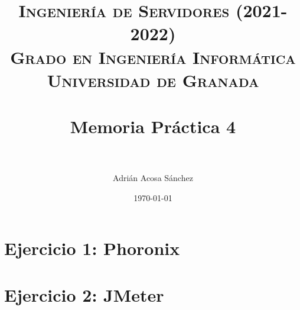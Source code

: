 


\title{	
\normalfont \normalsize 
\textsc{\textbf{Ingeniería de Servidores (2021-2022)} \\ Grado en Ingeniería Informática \\ Universidad de Granada} \\ [25pt] %
\horrule{0.5pt} \\[0.4cm] %
\huge Memoria Práctica 4 \\ %
\horrule{2pt} \\[0.5cm] %
}

\author{Adrián Acosa Sánchez} %

\date{\normalsize\today} %




\maketitle %

\newpage %

\tableofcontents %
 
\newpage


\section{Ejercicio 1: Phoronix}




\newpage
\section{Ejercicio 2: JMeter}







